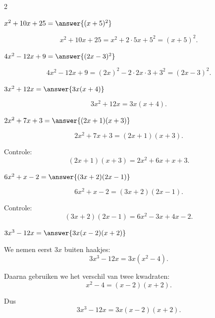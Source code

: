 \documentclass{ximera}
\begin{document}
\begin{oefening}[Ontbinden]{\oefB\ESS}
\begin{multicols}{2}
    
    \begin{question}
    $x^2+10x+25=\answer{(x+5)^2}$
    
    \begin{oplossing}
    \[
    x^2+10x+25
    =x^2+2\cdot5x+5^2
    =(x+5)^2.
    \]
    \end{oplossing}
    \end{question}
    
    
    \begin{question}
    $4x^2-12x+9=\answer{(2x-3)^2}$
    
    \begin{oplossing}
    \[
    4x^2-12x+9
    =(2x)^2-2\cdot2x\cdot3+3^2
    =(2x-3)^2.
    \]
    \end{oplossing}
    \end{question}
    
    
    \begin{question}
    $3x^2+12x=\answer{3x(x+4)}$
    
    \begin{oplossing}
    \[
    3x^2+12x
    =3x(x+4).
    \]
    \end{oplossing}
    \end{question}
    
    
    \begin{question}
    $2x^2+7x+3=\answer{(2x+1)(x+3)}$
    
    \begin{oplossing}
    \[
    2x^2+7x+3
    =(2x+1)(x+3).
    \]
    
    Controle:
    \[
    (2x+1)(x+3)
    =2x^2+6x+x+3.
    \]
    \end{oplossing}
    \end{question}
    
    
    \begin{question}
    $6x^2+x-2=\answer{(3x+2)(2x-1)}$
    
    \begin{oplossing}
    \[
    6x^2+x-2
    =(3x+2)(2x-1).
    \]
    
    Controle:
    \[
    (3x+2)(2x-1)
    =6x^2-3x+4x-2.
    \]
    \end{oplossing}
    \end{question}
    
    
    \begin{question}
    $3x^3-12x=\answer{3x(x-2)(x+2)}$
    
    \begin{oplossing}
    We nemen eerst $3x$ buiten haakjes:
    \[
    3x^3-12x
    =3x(x^2-4).
    \]
    
    Daarna gebruiken we het verschil van twee kwadraten:
    \[
    x^2-4=(x-2)(x+2).
    \]
    
    Dus
    \[
    3x^3-12x
    =3x(x-2)(x+2).
    \]
    \end{oplossing}
    \end{question}
    
    \end{multicols}
    
    \end{oefening}
    
\end{document}
